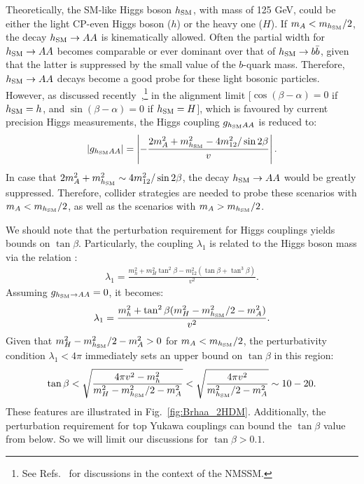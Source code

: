 \documentclass[preprintnumbers,superscriptaddress,nofootinbib,aps,prd,floatfix]{revtex4}
\begin{document}
Theoretically, the SM-like Higgs boson $h_{\rm SM}$, with mass of 125 GeV, could be either the light CP-even Higgs boson ($h$) or the heavy one ($H$). If $m_A < m_{h_{\rm SM}}/2$, the decay $h_{\rm SM}\to AA$ is kinematically allowed. Often the partial width for $h_{\rm SM}\to AA$ becomes comparable or ever dominant over that of $h_{\rm SM}\to b\bar{b}$, given that the latter is suppressed by the small value of the $b$-quark mass.  Therefore, $h_{\rm SM} \to AA$ decays become a good probe for these light bosonic particles. However, as discussed recently~\cite{Bernon:2014nxa},\footnote{See Refs.~\cite{Draper:2010ew,Huang:2014cla} for discussions in the context of the NMSSM.} in the alignment limit [$\cos(\beta -\alpha)=0$ if $h_{\rm SM}=h$, and $\sin(\beta -\alpha)=0$ if $h_{\rm SM}=H$], which is favoured by current precision Higgs measurements, the Higgs coupling $g_{h_{\rm SM} AA}$ is reduced to: 
\begin{eqnarray}
\left|g_{h_{\rm SM} AA}\right | = \left |-\frac{2 m_A^2 + m_{h_{\rm SM}}^2  - 4 m_{12}^2/\sin 2\beta }{v}\right |.
\end{eqnarray}
In case that  $2 m_A^2 + m_{h_{\rm SM}}^2  \sim 4 m_{12}^2/\sin 2\beta$, the decay $h_{\rm SM}\to AA$ would be greatly suppressed. Therefore, collider strategies  are needed to probe these scenarios with $m_A < m_{h_{\rm SM}}/2$, as well as the scenarios with $m_A > m_{h_{\rm SM}}/2$.

We should note that the perturbation requirement for Higgs couplings yields bounds on $\tan\beta$. Particularly, the coupling $\lambda_1$ is related to the Higgs boson mass via the relation \cite{Bernon:2014nxa}: 
\begin{eqnarray}
\lambda_1 = \frac{m_h^2 + m_H^2 \tan^2\beta -  m_{12}^2 (\tan\beta +\tan^3 \beta)}{v^2}.
\end{eqnarray}
Assuming $g_{h_{\rm SM}\to AA}=0$, it becomes: 
\begin{eqnarray}
\lambda_1 = \frac{m_h^2 + \tan^2\beta (m_H^2 - m_{h_{\rm SM}}^2/2 - m_A^2)  }{v^2}.
\end{eqnarray}
Given that $m_H^2 - m_{h_{\rm SM}}^2/2 - m_A^2 > 0$ for $m_A < m_{h_{\rm SM}}/2$, the perturbativity condition $\lambda_1 < 4\pi$ immediately sets an upper bound on $\tan\beta$ in this region:
\begin{eqnarray}
\tan\beta < \sqrt {\frac{4 \pi v^2 - m_h^2}{m_H^2 - m_{h_{\rm SM}}^2/2 - m_A^2 }} <  \sqrt {\frac{4 \pi v^2 }{m_{h_{\rm SM}}^2/2 - m_A^2 }}  \sim 10-20.
\end{eqnarray} 
These features are illustrated in Fig.~\ref{fig:Brhaa_2HDM}.  Additionally, the perturbation requirement for top Yukawa couplings can bound the $\tan\beta$ value from below. So we will limit our discussions for $\tan\beta > 0.1$. 
\end{document}
